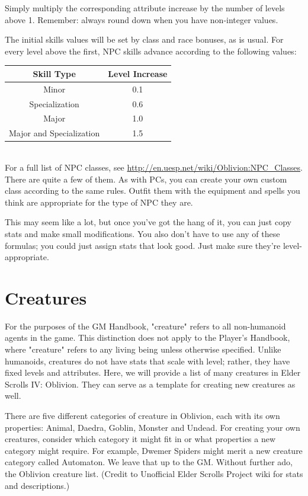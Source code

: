 \documentclass[12pt]{book}
\begin{document}
Simply multiply the corresponding attribute increase by the number of levels above 1. Remember: always round down when you have non-integer values.

The initial skills values will be set by class and race bonuses, as is usual. For every level above the first, NPC skills advance according to the following values:

\begin{tabular}{|c|c|}
\hline
Skill Type & Level Increase\\ \hline
Minor & 0.1\\ \hline
Specialization & 0.6\\ \hline
Major & 1.0\\ \hline
Major and Specialization & 1.5\\ \hline
\end{tabular}\\

For a full list of NPC classes, see \url{http://en.uesp.net/wiki/Oblivion:NPC_Classes}. There are quite a few of them. As with PCs, you can create your own custom class according to the same rules. Outfit them with the equipment and spells you think are appropriate for the type of NPC they are.

This may seem like a lot, but once you've got the hang of it, you can just copy stats and make small modifications. You also don't have to use any of these formulas; you could just assign stats that look good. Just make sure they're level-appropriate.

\section{Creatures}
For the purposes of the GM Handbook, "creature" refers to all non-humanoid agents in the game. This distinction does not apply to the Player's Handbook, where "creature" refers to any living being unless otherwise specified. Unlike humanoids, creatures do not have stats that scale with level; rather, they have fixed levels and attributes. Here, we will provide a list of many creatures in Elder Scrolls IV: Oblivion. They can serve as a template for creating new creatures as well.

There are five different categories of creature in Oblivion, each with its own properties: Animal, Daedra, Goblin, Monster and Undead. For creating your own creatures, consider which category it might fit in or what properties a new category might require. For example, Dwemer Spiders might merit a new creature category called Automaton. We leave that up to the GM. Without further ado, the Oblivion creature list. (Credit to Unofficial Elder Scrolls Project wiki for stats and descriptions.)
\end{document}
